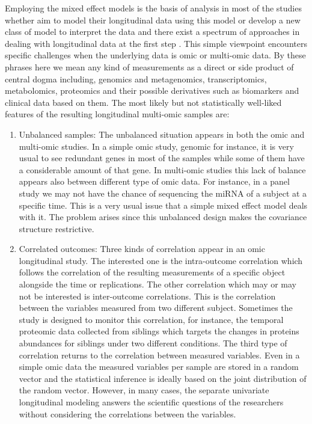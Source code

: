 \documentclass[]{article}
\begin{document}
	Employing the mixed effect models is the basis of analysis in most of the studies whether aim to model their longitudinal data using this model or develop a new class of model to interpret the data and there exist a spectrum of approaches in dealing with longitudinal data at the first step \citep{DiggleHeagertyLiang2013,Fitzmaurice2008,Singer2003,Weiss2005}. This simple viewpoint encounters specific challenges when the underlying data is omic or multi-omic data. By these phrases here we mean any kind of measurements as a direct or side product of central dogma including, genomics and metagenomics, transcriptomics, metabolomics, proteomics and their possible derivatives such as biomarkers and clinical data based on them. The most likely but not statistically well-liked features of the resulting longitudinal multi-omic samples are:
	\begin{enumerate}[wide, labelwidth=0pt, labelindent=0pt,label=\textit{\roman*}.]
		\item Unbalanced samples: The unbalanced situation appears in both the omic and multi-omic studies. In a simple omic study, genomic for instance, it is very usual to see redundant genes in most of the samples while some of them have a considerable amount of that gene. In multi-omic studies this lack of balance appears also between different type of omic data. For instance, in a panel study we may not have the chance of sequencing the miRNA of a subject at a specific time. This is a very usual issue that a simple mixed effect model deals with it. The problem arises since this unbalanced design makes the covariance structure restrictive.  
		\item Correlated outcomes: Three kinds of correlation appear in an omic longitudinal study. The interested one is the intra-outcome correlation which follows the correlation of the resulting measurements of a specific object alongside the time or replications. The other correlation which may or may not be interested is inter-outcome correlations. This is the correlation between the variables measured from two different subject. Sometimes the study is designed to monitor this correlation, for instance, the temporal proteomic data collected from siblings which targets the changes in proteins abundances for siblings under two different conditions. The third type of correlation returns to the correlation between measured variables. Even in a simple omic data the measured variables per sample are stored in a random vector and the statistical inference is ideally based on the joint distribution of the random vector. However, in many cases, the separate univariate longitudinal modeling answers the scientific questions of the researchers without considering the correlations between the variables.

\end{enumerate}
\end{document}

